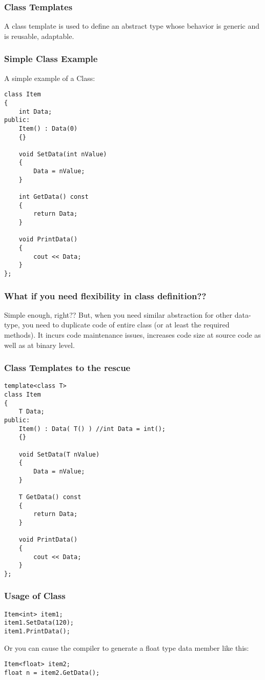 \documentclass{beamer}
\newtheorem{Key points}{Key points}
\newcommand\Fontviaa{\fontsize{8}{7.2}\selectfont}
\begin{document}
\begin{frame}[fragile]
\frametitle{Class Templates}
A class template is used to define an abstract type whose behavior is generic and is reusable, adaptable.
\end{frame}

\begin{frame}[fragile]
\frametitle{Simple Class Example}
A simple example of a Class:
\Fontviaa
\begin{lstlisting}
class Item
{
    int Data;
public:
    Item() : Data(0)
    {}

    void SetData(int nValue)
    { 
        Data = nValue;
    }

    int GetData() const
    {
        return Data;
    }

    void PrintData()
    {
        cout << Data;
    }
};
\end{lstlisting}
\end{frame}
\begin{frame}[fragile]
\frametitle{What if you need flexibility in class definition??}
Simple enough, right?? But, when you need similar abstraction for other data-type, you need to duplicate code of entire class (or at least the required methods). It incurs code maintenance issues, increases code size at source code as well as at binary level.
\end{frame}
\begin{frame}[fragile]
\frametitle{Class Templates to the rescue}
\Fontviaa
\begin{lstlisting}
template<class T>
class Item
{
    T Data;
public:
    Item() : Data( T() ) //int Data = int();
    {}

    void SetData(T nValue)
    {
        Data = nValue;
    }

    T GetData() const
    {
        return Data;
    }

    void PrintData()
    {
        cout << Data;
    }
};
\end{lstlisting}
\end{frame}
\begin{frame}[fragile]
\frametitle{Usage of Class}
\begin{lstlisting}
Item<int> item1;
item1.SetData(120);
item1.PrintData();
\end{lstlisting}
Or you can cause the compiler to generate a float type data member like this: 
\begin{lstlisting}
Item<float> item2;
float n = item2.GetData();
\end{lstlisting}
\end{frame}
\end{document}
